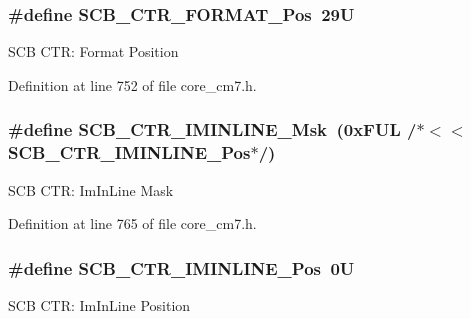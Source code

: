 \subsubsection[{\texorpdfstring{S\+C\+B\+\_\+\+C\+T\+R\+\_\+\+F\+O\+R\+M\+A\+T\+\_\+\+Pos}{SCB_CTR_FORMAT_Pos}}]{\setlength{\rightskip}{0pt plus 5cm}\#define S\+C\+B\+\_\+\+C\+T\+R\+\_\+\+F\+O\+R\+M\+A\+T\+\_\+\+Pos~29U}\hypertarget{group___c_m_s_i_s___s_c_b_gab3c7f12bf78e1049eeb477a1d48b144f}{}\label{group___c_m_s_i_s___s_c_b_gab3c7f12bf78e1049eeb477a1d48b144f}
S\+CB C\+TR\+: Format Position 

Definition at line 752 of file core\+\_\+cm7.\+h.

\subsubsection[{\texorpdfstring{S\+C\+B\+\_\+\+C\+T\+R\+\_\+\+I\+M\+I\+N\+L\+I\+N\+E\+\_\+\+Msk}{SCB_CTR_IMINLINE_Msk}}]{\setlength{\rightskip}{0pt plus 5cm}\#define S\+C\+B\+\_\+\+C\+T\+R\+\_\+\+I\+M\+I\+N\+L\+I\+N\+E\+\_\+\+Msk~(0x\+F\+U\+L /$\ast$$<$$<$ S\+C\+B\+\_\+\+C\+T\+R\+\_\+\+I\+M\+I\+N\+L\+I\+N\+E\+\_\+\+Pos$\ast$/)}\hypertarget{group___c_m_s_i_s___s_c_b_gac62440e20c39b8022279a4a706ef9aa3}{}\label{group___c_m_s_i_s___s_c_b_gac62440e20c39b8022279a4a706ef9aa3}
S\+CB C\+TR\+: Im\+In\+Line Mask 

Definition at line 765 of file core\+\_\+cm7.\+h.

\subsubsection[{\texorpdfstring{S\+C\+B\+\_\+\+C\+T\+R\+\_\+\+I\+M\+I\+N\+L\+I\+N\+E\+\_\+\+Pos}{SCB_CTR_IMINLINE_Pos}}]{\setlength{\rightskip}{0pt plus 5cm}\#define S\+C\+B\+\_\+\+C\+T\+R\+\_\+\+I\+M\+I\+N\+L\+I\+N\+E\+\_\+\+Pos~0U}\hypertarget{group___c_m_s_i_s___s_c_b_ga5be00464e6789da9619947d67d2a1529}{}\label{group___c_m_s_i_s___s_c_b_ga5be00464e6789da9619947d67d2a1529}
S\+CB C\+TR\+: Im\+In\+Line Position 

